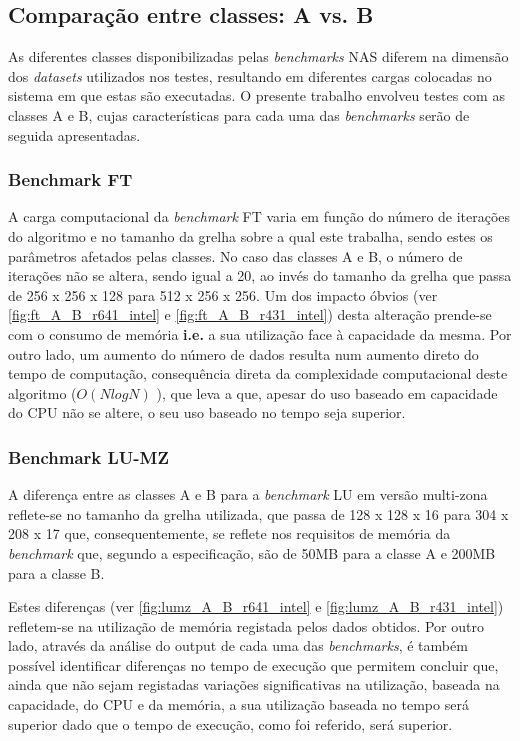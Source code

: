 \documentclass{article}
\begin{document}
\subsection{Comparação entre classes: A vs. B}

\quad As diferentes classes disponibilizadas pelas \textit{benchmarks} NAS diferem na dimensão dos \textit{datasets} utilizados nos 
testes, resultando em diferentes cargas colocadas no sistema em que estas são executadas. O presente trabalho envolveu testes com 
as classes A e B, cujas características para cada uma das \textit{benchmarks} serão de seguida apresentadas.


\subsubsection{Benchmark FT}

\quad A carga computacional da \textit{benchmark} FT varia em função do número de iterações do algoritmo e no tamanho da grelha sobre 
a qual este trabalha, sendo estes os parâmetros afetados pelas classes. No caso das classes A e B, o número de iterações não se altera, 
sendo igual a 20, ao invés do tamanho da grelha que passa de 256 x 256 x 128  para 512 x 256 x 256. Um dos impacto óbvios 
(ver \ref{fig:ft_A_B_r641_intel} e \ref{fig:ft_A_B_r431_intel}) desta alteração prende-se com o consumo de memória \textbf{i.e.} a sua 
utilização face à capacidade da mesma. Por outro lado, um aumento do número de dados resulta num aumento direto do tempo de computação, 
consequência direta da complexidade computacional deste algoritmo ($O(N log N )$ \cite{fft_complexity}), que leva a que, apesar do uso 
baseado em capacidade do CPU não se altere, o seu uso baseado no tempo seja superior.


\subsubsection{Benchmark LU-MZ}

\quad A diferença entre as classes A e B para a \textit{benchmark} LU em versão multi-zona reflete-se no tamanho da grelha utilizada, 
que passa de 128 x 128 x 16 para 304 x 208 x 17 que, consequentemente, se reflete nos requisitos de memória da \textit{benchmark} que, 
segundo a especificação, são de 50MB para a classe A e 200MB para a classe B.

Estes diferenças (ver \ref{fig:lumz_A_B_r641_intel} e \ref{fig:lumz_A_B_r431_intel}) refletem-se na utilização de memória registada 
pelos dados obtidos. Por outro lado, através da análise do output de cada uma das \textit{benchmarks}, é também possível identificar 
diferenças no tempo de execução que permitem concluir que, ainda que não sejam registadas variações significativas na utilização, 
baseada na capacidade, do CPU e da memória, a sua utilização baseada no tempo será superior dado que o tempo de execução, como foi 
referido, será superior.
\end{document}
